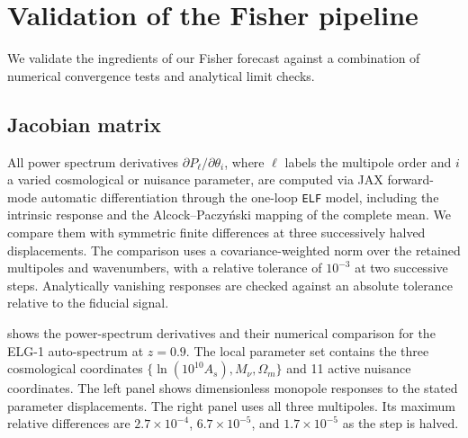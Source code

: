\documentclass[a4paper,11pt]{article}
\newcommand{\revchange}[1]{{\color{RevisionColor}#1}}
\newcommand{\Om}{\Omega_m}
\newcommand{\Mnu}{M_\nu}
\begin{document}
\appendix

\section{Validation of the Fisher pipeline}
\label{app:Fisher_convergence}

We validate the ingredients of our Fisher forecast against a combination of numerical convergence tests and analytical limit checks.

\subsection{Jacobian matrix}
\label{app:derivatives}

\revchange{All power spectrum derivatives $\partial P_\ell/\partial\theta_i$,
where $\ell$ labels the multipole order and $i$ a varied cosmological
or nuisance parameter,} are computed via JAX forward-mode automatic differentiation through the
\revchange{one-loop \texttt{ELF} model, including the intrinsic response and the
Alcock--Paczy\'nski mapping of the complete mean. We compare them with
symmetric finite differences at three successively halved displacements.
The comparison uses a covariance-weighted norm over the retained
multipoles and wavenumbers, with a relative tolerance of $10^{-3}$
at two successive steps. Analytically vanishing responses are checked
against an absolute tolerance relative to the fiducial signal.}

\revchange{ shows the power-spectrum derivatives and
their numerical comparison for the ELG-1 auto-spectrum at $z=0.9$.
The local parameter set contains the three cosmological coordinates
$\{\ln(10^{10}A_s),\Mnu,\Om\}$ and 11 active nuisance
coordinates. The left panel shows dimensionless monopole responses to
the stated parameter displacements. The right panel uses
all three multipoles. Its maximum relative differences are
$2.7\times10^{-4}$, $6.7\times10^{-5}$, and
$1.7\times10^{-5}$ as the step is halved.}
\end{document}
